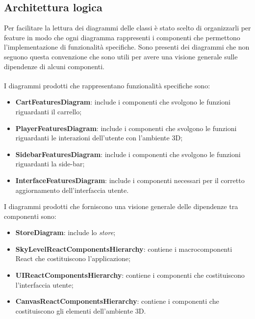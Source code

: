 \subsection{Architettura logica}
Per facilitare la lettura dei diagrammi delle classi è stato scelto di organizzarli per feature in modo che ogni diagramma 
rappresenti i componenti che permettono l'implementazione di funzionalità specifiche.
Sono presenti dei diagrammi che non seguono questa convenzione che sono utili per avere una visione generale sulle dipendenze
di alcuni componenti.
\\\\
I diagrammi prodotti che rappresentano funzionalità specifiche sono:
\begin{itemize}
	\item \textbf{CartFeaturesDiagram}: include i componenti che svolgono le funzioni riguardanti il carrello;
	\item \textbf{PlayerFeaturesDiagram}: include i componenti che svolgono le funzioni riguardanti le interazioni dell'utente con 
	l'ambiente 3D;
	\item \textbf{SidebarFeaturesDiagram}: include i componenti che svolgono le funzioni riguardanti la side-bar;
	\item \textbf{InterfaceFeaturesDiagram}: include i componenti necessari per il corretto aggiornamento dell'interfaccia utente.
\end{itemize}
I diagrammi prodotti che forniscono una visione generale delle dipendenze tra componenti sono:
\begin{itemize}
	\item \textbf{StoreDiagram}: include lo \textit{store};
	\item \textbf{SkyLevelReactComponentsHierarchy}: contiene i macrocomponenti React che costituiscono l'applicazione;
	\item \textbf{UIReactComponentsHierarchy}: contiene i componenti che costituiscono l'interfaccia utente;
	\item \textbf{CanvasReactComponentsHierarchy}: contiene i componenti che costituiscono gli elementi dell'ambiente 3D.
\end{itemize}
